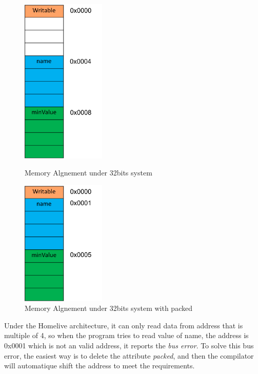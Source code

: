 \begin{figure}
\begin{minipage}[t]{0.5\linewidth}
\centering
\includegraphics[width=4cm]{Figures/alignement1.png}
\caption{Memory Algnement under 32bits system}
\label{fig:side:a}
\end{minipage}%
\begin{minipage}[t]{0.5\linewidth}
\centering
\includegraphics[width=4cm]{Figures/alignement2.png}
\caption{Memory Algnement under 32bits system with packed}
\label{fig:side:b}
\end{minipage}
\end{figure}


Under the Homelive architecture, it can only read data from address that is multiple of 4, so when the program tries to read value of name, the address is 0x0001 which is not an valid address, it reports the \textit{bus error}. To solve this bus error, the easiest way is to delete the attribute \textit{packed}, and then the compilator will automatique shift the address to meet the requirements.


